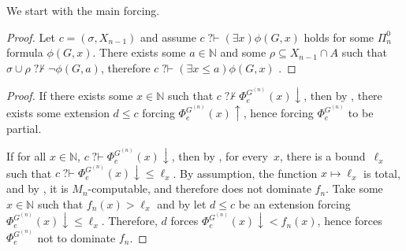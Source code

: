 \documentclass{article}
\def\NN{\mathbb{N}}
\def\MM{\mathbb{M}}
\newcommand{\converge}{\!\!\downarrow}
\newcommand{\diverge}{\!\!\uparrow}
\newcommand{\qvdash}{\operatorname{{?}{\vdash}}}
\newcommand{\nqvdash}{\operatorname{{?}{\nvdash}}}
\numberwithin{theorem}{section}
\newtheorem{lemma}[theorem]{Lemma}
\theoremstyle{definition}
\begin{document}
We start with the main forcing.


\begin{proof}
Let $c = (\sigma, X_{n-1})$ and assume $c \qvdash (\exists x)  \phi(G,x)$ holds for some $\Pi_{n}^0$ formula $\phi(G,x)$. There exists some $a \in \NN$ and some $\rho \subseteq X_{n-1} \cap A$ such that $\sigma \cup \rho \nqvdash \neg \phi(G,a)$, therefore  $c \qvdash (\exists x \leq a)\phi(G,x)$ . 
\end{proof}



\begin{proof}
If there exists some $x \in \NN$ such that $c \nqvdash \Phi_e^{G^{(n)}}(x) \converge$, then by , there exists some extension $d \leq c$ forcing $\Phi_e^{G^{(n)}}(x) \diverge$, hence forcing $\Phi_e^{G^{(n)}}$ to be partial.

If for all $x \in \NN$, $c \qvdash \Phi_e^{G^{(n)}}(x)\converge$, then by , for every~$x$, there is a bound~$\ell_x$ such that $c \qvdash \Phi_e^{G^{(n)}}(x) \converge \leq \ell_x$. By assumption, the function $x \mapsto \ell_x$ is total, and by , it is $M_n$-computable, and therefore does not dominate $f_n$. Take some $x \in \NN$ such that $f_n(x) > \ell_x$ and by  let $d \leq c$ be an extension forcing $\Phi_e^{G^{(n)}}(x) \converge \leq  \ell_x$. Therefore, $d$ forces $\Phi_e^{G^{(n)}}(x) \converge < f_n(x)$, hence forces $\Phi_e^{G^{(n)}}$ not to dominate $f_n$.    
\end{proof}
\end{document}
